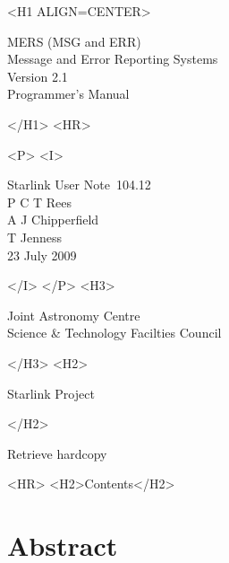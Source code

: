 \documentclass[twoside,11pt]{article}
\newcommand{\stardoccategory}  {Starlink User Note}
\newcommand{\stardocsource}    {sun\stardocnumber}
\newcommand{\stardocnumber}    {104.12}
\newcommand{\stardocauthors}   {P C T Rees \\
                                A J Chipperfield \\
                                T Jenness}
\newcommand{\stardocdate}      {23 July 2009}
\newcommand{\stardoctitle}     {MERS (MSG and ERR)\\ [1ex]
                                Message and Error Reporting Systems}
\newcommand{\stardocversion}   {Version 2.1}
\newcommand{\stardocmanual}    {Programmer's Manual}
\newcommand{\htmladdnormallink}[2]{#1}
\newcommand{\htmladdimg}[1]{}
\newcommand{\htmlref}[2]{#1}
\newcommand{\htmladdtonavigation}[1]{}
\newcommand{\xlabel}[1]{}
\renewcommand{\_}{\texttt{\symbol{95}}}
\begin{document}
\begin{htmlonly}
   \xlabel{}
   \begin{rawhtml} <H1 ALIGN=CENTER> \end{rawhtml}
      \stardoctitle\\
      \stardocversion\\
      \stardocmanual
   \begin{rawhtml} </H1> <HR> \end{rawhtml}


   \begin{rawhtml} <P> <I> \end{rawhtml}
   \stardoccategory\ \stardocnumber \\
   \stardocauthors \\
   \stardocdate
   \begin{rawhtml} </I> </P> <H3> \end{rawhtml}
      \htmladdnormallink{Joint Astronomy Centre}
                        {http://www.jach.hawaii.edu} \\
      \htmladdnormallink{Science \& Technology Facilties Council}
                        {http://www.scitech.ac.uk} \\
   \begin{rawhtml} </H3> <H2> \end{rawhtml}
      \htmladdnormallink{Starlink Project}{http://starlink.jach.hawaii.edu/}
   \begin{rawhtml} </H2> \end{rawhtml}
   \htmladdnormallink{\htmladdimg{source.gif} Retrieve hardcopy}
      {http://starlink.jach.hawaii.edu/cgi-bin/hcserver?\stardocsource}\\

  \label{stardoccontents}
  \begin{rawhtml}
    <HR>
    <H2>Contents</H2>
  \end{rawhtml}
  \htmladdtonavigation{\htmlref{\htmladdimg{contents_motif.gif}}
        {stardoccontents}}

  \section{\xlabel{abstract}Abstract}
\end{htmlonly}
\end{document}

